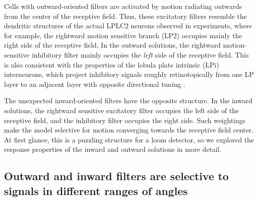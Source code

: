 \documentclass[pdftex,9pt,lineno]{elife}
\begin{document}
Cells with outward-oriented filters are activated by motion radiating outwards from the center of the receptive field. Thus, these excitatory filters resemble the dendritic structures of the actual LPLC2 neurons observed in experiments, where for example, the rightward motion sensitive branch (LP2) occupies mainly the right side of the receptive field. In the outward solutions, the rightward motion-sensitive inhibitory filter mainly occupies the \textit{left} side of the receptive field. This is also consistent with the properties of the lobula plate intrinsic (LPi) interneurons, which project inhibitory signals roughly retinotopically from one LP layer to an adjacent layer with opposite directional tuning \citep{mauss2015neural,klapoetke2017ultra}.

The unexpected inward-oriented filters have the opposite structure. In the inward solutions, the rightward sensitive excitatory filter occupies the left side of the receptive field, and the inhibitory filter occupies the right side. Such weightings make the model selective for motion converging towards the receptive field center. At first glance, this is a puzzling structure for a loom detector, so we explored the response properties of the inward and outward solutions in more detail. 

\subsection{Outward and inward filters are selective to signals in different ranges of angles}




\end{document}
